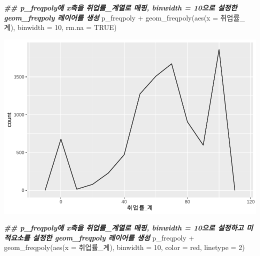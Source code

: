 \documentclass[
]{article}
\newenvironment{Shaded}{\begin{snugshade}}{\end{snugshade}}
\newcommand{\AttributeTok}[1]{\textcolor[rgb]{0.77,0.63,0.00}{#1}}
\newcommand{\ConstantTok}[1]{\textcolor[rgb]{0.00,0.00,0.00}{#1}}
\newcommand{\DecValTok}[1]{\textcolor[rgb]{0.00,0.00,0.81}{#1}}
\newcommand{\DocumentationTok}[1]{\textcolor[rgb]{0.56,0.35,0.01}{\textbf{\textit{#1}}}}
\newcommand{\FunctionTok}[1]{\textcolor[rgb]{0.00,0.00,0.00}{#1}}
\newcommand{\NormalTok}[1]{#1}
\newcommand{\SpecialCharTok}[1]{\textcolor[rgb]{0.00,0.00,0.00}{#1}}
\newcommand{\StringTok}[1]{\textcolor[rgb]{0.31,0.60,0.02}{#1}}
\begin{document}
\begin{Shaded}
\begin{Highlighting}[]
\DocumentationTok{\#\# p\_freqpoly에 x축을 \textquotesingle{}취업률\_계\textquotesingle{}열로 매핑, binwidth = 10으로 설정한 geom\_freqpoly 레이어를 생성 }
\NormalTok{p\_freqpoly }\SpecialCharTok{+}
  \FunctionTok{geom\_freqpoly}\NormalTok{(}\FunctionTok{aes}\NormalTok{(}\AttributeTok{x =}\NormalTok{ 취업률\_계), }\AttributeTok{binwidth =} \DecValTok{10}\NormalTok{, }\AttributeTok{rm.na =} \ConstantTok{TRUE}\NormalTok{)}
\end{Highlighting}
\end{Shaded}

\includegraphics{chap3_files/figure-latex/unnamed-chunk-22-3.pdf}

\begin{Shaded}
\begin{Highlighting}[]
\DocumentationTok{\#\# p\_freqpoly에 x축을 \textquotesingle{}취업률\_계\textquotesingle{}열로 매핑, binwidth = 10으로 설정하고 미적요소를 설정한 geom\_freqpoly 레이어를 생성}
\NormalTok{p\_freqpoly }\SpecialCharTok{+}
  \FunctionTok{geom\_freqpoly}\NormalTok{(}\FunctionTok{aes}\NormalTok{(}\AttributeTok{x =}\NormalTok{ 취업률\_계), }\AttributeTok{binwidth =} \DecValTok{10}\NormalTok{, }\AttributeTok{color =} \StringTok{\textquotesingle{}red\textquotesingle{}}\NormalTok{, }\AttributeTok{linetype =} \DecValTok{2}\NormalTok{)}
\end{Highlighting}
\end{Shaded}
\end{document}
